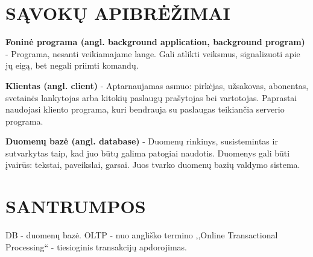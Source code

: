 \documentclass[12pt,a4paper,titlepage]{article}
\begin{document}
\section*{SĄVOKŲ APIBRĖŽIMAI}

\textbf{Foninė programa (angl. background application, background program)} - Programa, nesanti veikiamajame lange.
Gali atlikti veiksmus, signalizuoti apie jų eigą, bet negali priimti komandų.

\textbf{Klientas (angl. client)} - Aptarnaujamas asmuo: pirkėjas, užsakovas, abonentas, svetainės lankytojas arba kitokių paslaugų prašytojas bei vartotojas. Paprastai naudojasi kliento programa, kuri bendrauja su paslaugas teikiančia serverio programa.

\textbf{Duomenų bazė (angl. database)} - Duomenų rinkinys, susistemintas ir sutvarkytas taip, kad juo būtų galima patogiai naudotis. Duomenys gali būti įvairūs: tekstai, paveikslai, garsai. Juos tvarko duomenų bazių valdymo sistema.

\section*{SANTRUMPOS}
DB - duomenų bazė.
OLTP - nuo angliško termino ,,Online Transactional Processing`` - tiesioginis transakcijų apdorojimas.
\end{document}
